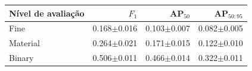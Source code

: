 \begin{tabular}{lrrr}
\toprule
Nível de avaliação & $F_1$ & AP$_{50}$ & AP$_{50:95}$ \\
\midrule
Fine & 0.168$\pm$0.016 & 0.103$\pm$0.007 & 0.082$\pm$0.005 \\
Material & 0.264$\pm$0.021 & 0.171$\pm$0.015 & 0.122$\pm$0.010 \\
Binary & 0.506$\pm$0.011 & 0.466$\pm$0.014 & 0.322$\pm$0.011 \\
\bottomrule
\end{tabular}
